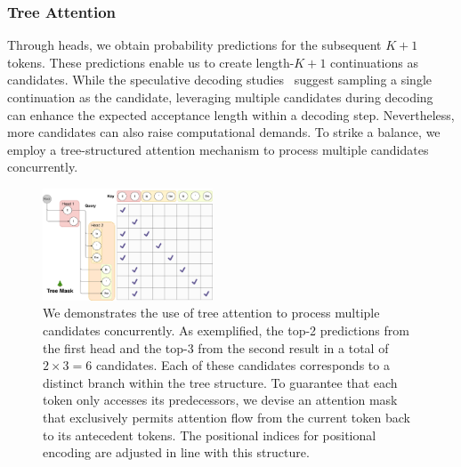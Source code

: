\subsubsection{Tree Attention}
\label{sec:tree_attention}
Through \ours heads, we obtain probability predictions for the subsequent $K+1$ tokens. These predictions enable us to create length-$K+1$ continuations as candidates. While the speculative decoding studies~\citep{leviathan2022fast,chen2023accelerating} suggest sampling a single continuation as the candidate, leveraging multiple candidates during decoding can enhance the expected acceptance length within a decoding step. Nevertheless, more candidates can also raise computational demands. To strike a balance, we employ a tree-structured attention mechanism to process multiple candidates concurrently.
\begin{figure}[ht]
    \centering
    \includegraphics[width=0.45\textwidth]{tree_attention.png}
    \caption{
    We demonstrates the use of tree attention to process multiple candidates concurrently. As exemplified, the top-2 predictions from the first \ours head and the top-3 from the second result in a total of $2\times3=6$ candidates. Each of these candidates corresponds to a distinct branch within the tree structure. To guarantee that each token only accesses its predecessors, we devise an attention mask that exclusively permits attention flow from the current token back to its antecedent tokens. The positional indices for positional encoding are adjusted in line with this structure.}
    \label{fig:tree_attention}
\end{figure}

